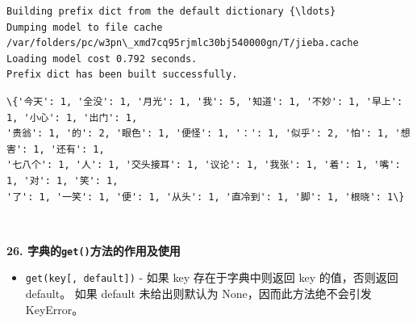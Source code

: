 \documentclass[11pt]{article}
\providecommand{\tightlist}{%
      \setlength{\itemsep}{0pt}\setlength{\parskip}{0pt}}
\begin{document}
    \begin{Verbatim}[commandchars=\\\{\}]
Building prefix dict from the default dictionary {\ldots}
Dumping model to file cache
/var/folders/pc/w3pn\_xmd7cq95rjmlc30bj540000gn/T/jieba.cache
Loading model cost 0.792 seconds.
Prefix dict has been built successfully.
    \end{Verbatim}

    \begin{Verbatim}[commandchars=\\\{\}]
\{'今天': 1, '全没': 1, '月光': 1, '我': 5, '知道': 1, '不妙': 1, '早上': 1, '小心': 1, '出门': 1,
'贵翁': 1, '的': 2, '眼色': 1, '便怪': 1, '：': 1, '似乎': 2, '怕': 1, '想害': 1, '还有': 1,
'七八个': 1, '人': 1, '交头接耳': 1, '议论': 1, '我张': 1, '着': 1, '嘴': 1, '对': 1, '笑': 1,
'了': 1, '一笑': 1, '便': 1, '从头': 1, '直冷到': 1, '脚': 1, '根晓': 1\}
    \end{Verbatim}

    \begin{center}
    \end{center}
    { \hspace*{\fill} \\}
    
    \textbf{26. 字典的\texttt{get()}方法的作用及使用}

\begin{itemize}
\tightlist
\item
  \texttt{get(key{[},\ default{]})} - 如果 key 存在于字典中则返回 key
  的值，否则返回 default。 如果 default 未给出则默认为
  None，因而此方法绝不会引发 KeyError。
\end{itemize}
\end{document}
